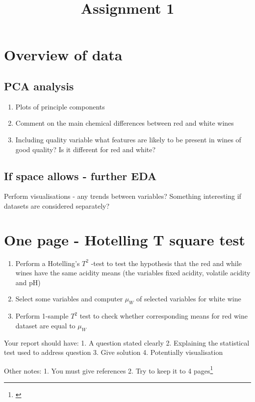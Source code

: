 \documentclass[
]{article}
\title{Assignment 1}
\author{}
\date{\vspace{-2.5em}}
\providecommand{\tightlist}{%
  \setlength{\itemsep}{0pt}\setlength{\parskip}{0pt}}
\begin{document}
\maketitle

\section{Overview of data}\label{overview-of-data}

\subsection{PCA analysis}\label{pca-analysis}

\begin{enumerate}
\def\labelenumi{\arabic{enumi}.}
\tightlist
\item
  Plots of principle components
\item
  Comment on the main chemical differences between red and white wines
\item
  Including quality variable what features are likely to be present in
  wines of good quality? Is it different for red and white?
\end{enumerate}

\subsection{If space allows - further
EDA}\label{if-space-allows---further-eda}

Perform visualisations - any trends between variables? Something
interesting if datasets are considered separately?

\section{One page - Hotelling T square
test}\label{one-page---hotelling-t-square-test}

\begin{enumerate}
\def\labelenumi{\arabic{enumi}.}
\tightlist
\item
  Perform a Hotelling's \(T^2\) -test to test the hypothesis that the
  red and while wines have the same acidity means (the variables fixed
  acidity, volatile acidity and pH)
\item
  Select some variables and computer \(\mu_W\) of selected variables for
  white wine
\item
  Perform 1-sample \(T^2\) test to check whether corresponding means for
  red wine dataset are equal to \(\mu_W\)
\end{enumerate}

Your report should have: 1. A question stated clearly 2. Explaining the
statistical test used to address question 3. Give solution 4.
Potentially visualisation

Other notes: 1. You must give references 2. Try to keep it to 4
pages\footnote{\textcite{RN1}}

\printbibliography
\end{document}
